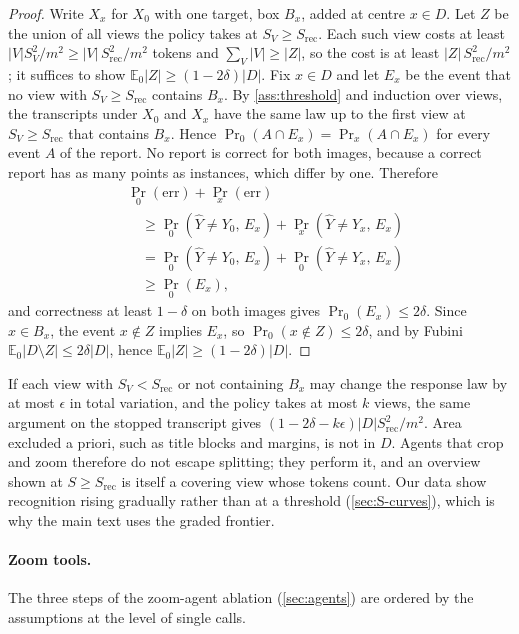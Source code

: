 \begin{proof}
Write $X_x$ for $X_0$ with one target, box $B_x$, added at centre $x \in D$. Let $Z$ be the union of all views the policy takes at $S_V \ge S_{\mathrm{rec}}$. Each such view costs at least $|V|S_V^2/m^2 \ge |V|\,S_{\mathrm{rec}}^2/m^2$ tokens and $\sum_V |V| \ge |Z|$, so the cost is at least $|Z|\,S_{\mathrm{rec}}^2/m^2$; it suffices to show $\mathbb{E}_0|Z| \ge (1-2\delta)|D|$. Fix $x \in D$ and let $E_x$ be the event that no view with $S_V \ge S_{\mathrm{rec}}$ contains $B_x$. By \cref{ass:threshold} and induction over views, the transcripts under $X_0$ and $X_x$ have the same law up to the first view at $S_V \ge S_{\mathrm{rec}}$ that contains $B_x$. Hence $\Pr_0(A \cap E_x) = \Pr_x(A \cap E_x)$ for every event $A$ of the report. No report is correct for both images, because a correct report has as many points as instances, which differ by one. Therefore
\begin{align*}
&\Pr_0(\mathrm{err}) + \Pr_x(\mathrm{err})\\
&\quad\ge \Pr_0(\hat Y \ne Y_0,\, E_x) + \Pr_x(\hat Y \ne Y_x,\, E_x)\\
&\quad= \Pr_0(\hat Y \ne Y_0,\, E_x) + \Pr_0(\hat Y \ne Y_x,\, E_x)\\
&\quad\ge \Pr_0(E_x),
\end{align*}
and correctness at least $1-\delta$ on both images gives $\Pr_0(E_x) \le 2\delta$. Since $x \in B_x$, the event $x \notin Z$ implies $E_x$, so $\Pr_0(x \notin Z) \le 2\delta$, and by Fubini $\mathbb{E}_0|D \setminus Z| \le 2\delta|D|$, hence $\mathbb{E}_0|Z| \ge (1-2\delta)|D|$.
\end{proof}

If each view with $S_V < S_{\mathrm{rec}}$ or not containing $B_x$ may change the response law by at most $\epsilon$ in total variation, and the policy takes at most $k$ views, the same argument on the stopped transcript gives $(1 - 2\delta - k\epsilon)|D|S_{\mathrm{rec}}^2/m^2$. Area excluded a priori, such as title blocks and margins, is not in $D$. Agents that crop and zoom therefore do not escape splitting; they perform it, and an overview shown at $S \ge S_{\mathrm{rec}}$ is itself a covering view whose tokens count. Our data show recognition rising gradually rather than at a threshold (\cref{sec:S-curves}), which is why the main text uses the graded frontier.

\paragraph{Zoom tools.} The three steps of the zoom-agent ablation (\cref{sec:agents}) are ordered by the assumptions at the level of single calls.

